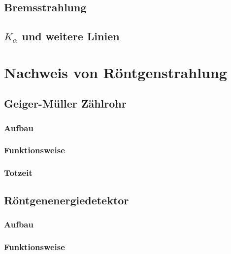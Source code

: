 \subsection{Bremsstrahlung}

\parencite[Abschnitt~17.3.4]{meschede-gerthsen_24}

\subsection{$K_\alpha$ und weitere Linien}

\parencite[Abschnitt~17.3.5]{meschede-gerthsen_24}

\section{Nachweis von Röntgenstrahlung}

\subsection{Geiger-Müller Zählrohr}

\parencite[Abschnitt~9.3.2]{meschede-gerthsen_24}

\parencite[Abschnitt~19.3.2~d)]{meschede-gerthsen_24}

\subsubsection{Aufbau}

\subsubsection{Funktionsweise}

\subsubsection{Totzeit}

\subsection{Röntgenenergiedetektor}

\subsubsection{Aufbau}

\subsubsection{Funktionsweise}

